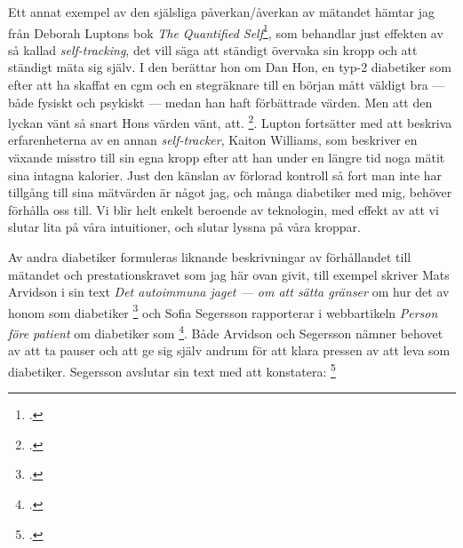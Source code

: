 \documentclass[11pt, a4paper]{article} %
\begin{document}
Ett annat exempel av den själsliga påverkan/åverkan av mätandet hämtar jag från Deborah Luptons bok \emph{The Quantified Self}\footcite{lupton_quantified_2016}, som behandlar just effekten av så kallad \emph{self-tracking}, det vill säga att ständigt övervaka sin kropp och att ständigt mäta sig själv. I den berättar hon om Dan Hon, en typ-2 diabetiker som efter att ha skaffat en \gls{cgm} och en stegräknare till en början mått väldigt bra --- både fysiskt och psykiskt --- medan han haft förbättrade värden. Men att den lyckan vänt så snart Hons värden vänt, att. \footcite[80]{lupton_quantified_2016}. Lupton fortsätter med att beskriva erfarenheterna av en annan \emph{self-tracker}, Kaiton Williams, som beskriver en växande misstro till sin egna kropp efter att han under en längre tid noga mätit sina intagna kalorier. Just den känslan av förlorad kontroll så fort man inte har tillgång till sina mätvärden är något jag, och många diabetiker med mig, behöver förhålla oss till. Vi blir helt enkelt beroende av teknologin, med effekt av att vi slutar lita på våra intuitioner, och slutar lyssna på våra kroppar. 

Av andra diabetiker formuleras liknande beskrivningar av förhållandet till mätandet och prestationskravet som jag här ovan givit, till exempel skriver Mats Arvidson i sin text \emph{Det autoimmuna jaget --- om att sätta gränser} om hur det av honom som diabetiker  \footcite[284]{arvidson_det_2016} och Sofia Segersson rapporterar i webbartikeln \emph{Person före patient} om diabetiker som \footcite{segersson_person_2021}. Både Arvidson och Segersson nämner behovet av att ta pauser och att ge sig själv andrum för att klara pressen av att leva som diabetiker. Segersson avslutar sin text med att konstatera: \footcite{segersson_person_2021}
\end{document}
